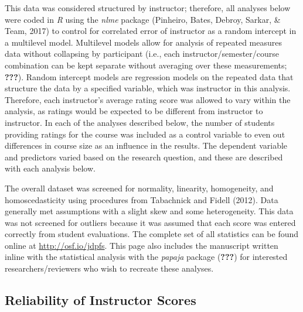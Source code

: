 \documentclass[,man]{apa6}
\theoremstyle{definition}
\theoremstyle{definition}
\theoremstyle{definition}
\theoremstyle{remark}
\begin{document}
This data was considered structured by instructor; therefore, all
analyses below were coded in \emph{R} using the \emph{nlme} package
(Pinheiro, Bates, Debroy, Sarkar, \& Team, 2017) to control for
correlated error of instructor as a random intercept in a multilevel
model. Multilevel models allow for analysis of repeated measures data
without collapsing by participant (i.e., each instructor/semester/course
combination can be kept separate without averaging over these
measurements; {\textbf{???}}). Random intercept models are regression
models on the repeated data that structure the data by a specified
variable, which was instructor in this analysis. Therefore, each
instructor's average rating score was allowed to vary within the
analysis, as ratings would be expected to be different from instructor
to instructor. In each of the analyses described below, the number of
students providing ratings for the course was included as a control
variable to even out differences in course size as an influence in the
results. The dependent variable and predictors varied based on the
research question, and these are described with each analysis below.

The overall dataset was screened for normality, linearity, homogeneity,
and homoscedasticity using procedures from Tabachnick and Fidell (2012).
Data generally met assumptions with a slight skew and some
heterogeneity. This data was not screened for outliers because it was
assumed that each score was entered correctly from student evaluations.
The complete set of all statistics can be found online at
\url{http://osf.io/jdpfs}. This page also includes the manuscript
written inline with the statistical analysis with the \emph{papaja}
package ({\textbf{???}}) for interested researchers/reviewers who wish
to recreate these analyses.

\hypertarget{reliability-of-instructor-scores}{%
\subsection{Reliability of Instructor
Scores}\label{reliability-of-instructor-scores}}
\end{document}
